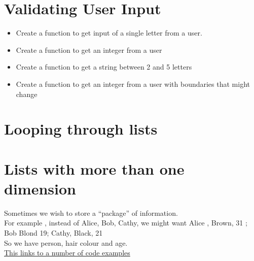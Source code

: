 \documentclass[a4paper,12pt]{article}
\begin{document}
\section{Validating User Input}
\begin{itemize}
\item Create a function to get input of a single letter from a user.
\item  Create a function to get an integer from a user
\item Create a function to get a string between 2 and 5 letters
\item Create a function to get an integer from a user with boundaries that might change
\end{itemize}
\section{Looping through lists}
\section{Lists with more than one dimension}
Sometimes we wish to store a ``package'' of information.\\
For example , instead of Alice, Bob, Cathy, we might want Alice , Brown, 31 ; Bob Blond 19; Cathy, Black, 21\\
So we have person, hair colour and age.\\




\hyperlink{Lists}{This links to a number of code examples}
\newpage
	\hypertarget{Lists}{}




\end{document}
